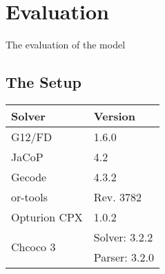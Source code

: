 \chapter{Evaluation}\label{cha:eval}
The evaluation of the model

\section{The Setup}

\begin{tabular}{l|l}
Solver                    & Version \\ \hline
G12/FD                    & 1.6.0\\
JaCoP                     & 4.2 \\
Gecode                    & 4.3.2 \\
or-tools                  & Rev. 3782 \\
Opturion CPX              & 1.0.2 \\
\multirow{2}{*}{Chcoco 3} & Solver: 3.2.2 \\
                          & Parser: 3.2.0
\end{tabular}

\begin{landscape}
\hspace*{\fill}
\noindent
\hspace*{\fill}
\\
\hspace*{\fill}

\hspace*{\fill}
\\
\hspace*{\fill}

\hspace*{\fill}
\\
\hspace*{\fill}

\hspace*{\fill}
\\
\hspace*{\fill}

\hspace*{\fill}
\\
\hspace*{\fill}

\hspace*{\fill}
\\
\hspace*{\fill}

\hspace*{\fill}
\end{landscape}


